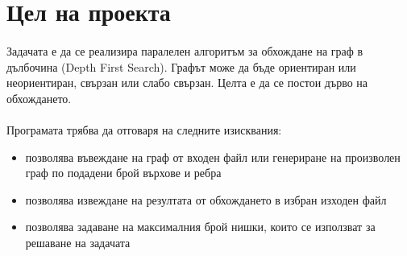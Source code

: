 \section{Цел на проекта}

\paragraph*{} Задачата е да се реализира паралелен алгоритъм за обхождане на граф в дълбочина (Depth First Search). Графът може да бъде ориентиран или неориентиран, свързан или слабо свързан. Целта е да се постои дърво на обхождането.

\paragraph*{} Програмата трябва да отговаря на следните изисквания:
\begin{itemize}
\item позволява въвеждане на граф от входен файл или генериране на произволен граф по подадени брой върхове и ребра
\item позволява извеждане на резултата от обхождането в избран изходен файл
\item позволява задаване на максималния брой нишки, които се използват за решаване на задачата
\end{itemize}
